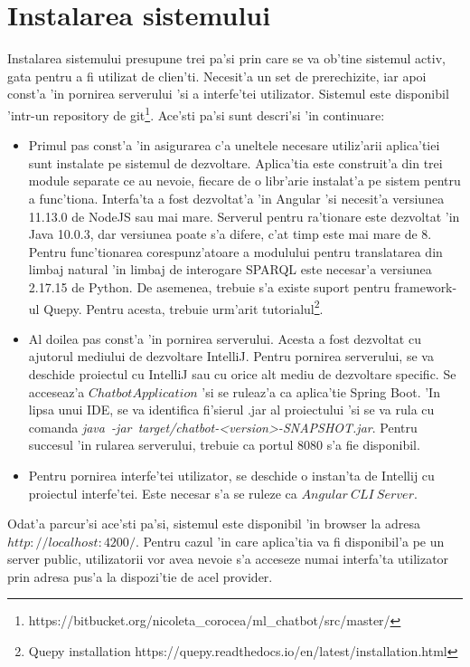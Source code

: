 \documentclass[12pt,a4paper,twoside]{report}
\begin{document}
\section{Instalarea sistemului}

Instalarea sistemului presupune trei pa'si prin care se va ob'tine sistemul activ, gata pentru a fi utilizat de clien'ti. Necesit'a un set de prerechizite, iar apoi const'a 'in pornirea serverului 'si a interfe'tei utilizator. Sistemul este disponibil 'intr-un repository de git\footnote{https://bitbucket.org/nicoleta_corocea/ml_chatbot/src/master/}. Ace'sti pa'si sunt descri'si 'in continuare:

\begin{itemize}
    \item Primul pas const'a 'in asigurarea c'a uneltele necesare utiliz'arii aplica'tiei sunt instalate pe sistemul de dezvoltare. Aplica'tia este construit'a din trei module separate ce au nevoie, fiecare de o libr'arie instalat'a pe sistem pentru a func'tiona. Interfa'ta a fost dezvoltat'a 'in Angular 'si necesit'a versiunea 11.13.0 de NodeJS sau mai mare. Serverul pentru ra'tionare este dezvoltat 'in Java 10.0.3, dar versiunea poate s'a difere, c'at timp este mai mare de 8. Pentru func'tionarea corespunz'atoare a modulului pentru translatarea din limbaj natural 'in limbaj de interogare SPARQL este necesar'a versiunea 2.17.15 de Python. De asemenea, trebuie s'a existe suport pentru framework-ul Quepy. Pentru acesta, trebuie urm'arit tutorialul\footnote{Quepy installation https://quepy.readthedocs.io/en/latest/installation.html}.
    \item Al doilea pas const'a 'in pornirea serverului. Acesta a fost dezvoltat cu ajutorul mediului de dezvoltare IntelliJ. Pentru pornirea serverului, se va deschide proiectul cu IntelliJ sau cu orice alt mediu de dezvoltare specific. Se acceseaz'a $ChatbotApplication$ 'si se ruleaz'a ca aplica'tie Spring Boot. 'In lipsa unui IDE, se va identifica fi'sierul .jar al proiectului 'si se va rula cu comanda {\it java\ -jar\ target/chatbot-<version>-SNAPSHOT.jar}. Pentru succesul 'in rularea serverului, trebuie ca portul 8080 s'a fie disponibil.
    \item Pentru pornirea interfe'tei utilizator, se deschide o instan'ta de Intellij cu proiectul interfe'tei. Este necesar s'a se ruleze ca $Angular\ CLI\ Server$. 
\end{itemize}

Odat'a parcur'si ace'sti pa'si, sistemul este disponibil 'in browser la adresa $http://localhost:4200/$. Pentru cazul 'in care aplica'tia va fi disponibil'a pe un server public, utilizatorii vor avea nevoie s'a acceseze numai interfa'ta utilizator prin adresa pus'a la dispozi'tie de acel provider.
\end{document}
